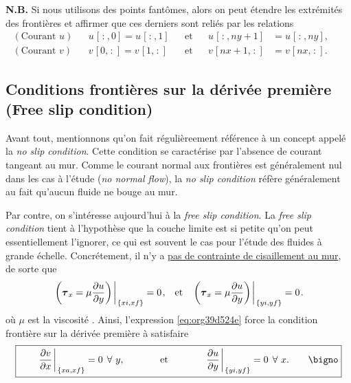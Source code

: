 \documentclass[10pt]{article}
\numberwithin{equation}{section}
\newcommand{\pt}{\hspace{1pt}} %
\begin{document}
\textbf{N.B.} Si nous utilisons des points fantômes, alors on peut étendre les extrémités des frontières et affirmer que ces derniers sont reliés par les relations
\begin{subequations}
\begin{align}
(\text{Courant }u) &&  u\pt[\pt:\pt,0] = u\pt[\pt:\pt,1] && \text{et} && u\pt[\pt:\pt,ny+1] &= u\pt[\pt:\pt,ny],&&\\
(\text{Courant }v) &&  v\pt[0,\pt:\pt] = v\pt[1,\pt:\pt] && \text{et} && v\pt[nx+1,\pt:\pt] &= v\pt[nx,\pt:\pt].&&
\end{align}
\end{subequations}

\subsection{Conditions frontières sur la dérivée première (Free slip condition)}
\label{sec:org9362732}
Avant tout, mentionnons qu'on fait régulièreement référence à un concept appelé la \emph{no slip condition}.
Cette condition se caractérise par l'absence de courant tangeant au mur.
Comme le courant normal aux frontières est généralement nul dans les cas à l'étude (\emph{no normal flow}), la \emph{no slip condition} réfère généralement au fait qu'aucun fluide ne bouge au mur.\bigskip

Par contre, on s'intéresse aujourd'hui à la \emph{free slip condition}.
La \emph{free slip condition} tient à l'hypothèse que la couche limite est si petite qu'on peut essentiellement l'ignorer, ce qui est souvent le cas pour l'étude des fluides à grande échelle.
Concrétement, il n'y a \href{https://physics.stackexchange.com/questions/383096/understanding-free-slip-boundary-condition\#:\~:text=On\%20the\%20other\%20hand\%2C\%20the,the\%20tangential\%20component\%20is\%20unrestricted.}{pas de contrainte de cisaillement au mur}, de sorte que
\begin{align}
\label{eq:org39d524e}
&&\eval{\qty(\boldsymbol{\tau}_x = \mu \pdv{u}{y})\pt }_{\pt\{xi,xf\}} = 0\pt, && \text{et} &&
  \eval{\qty(\boldsymbol{\tau}_x = \mu \pdv{u}{y})\pt }_{\pt\{yi,yf\}} = 0\pt. &&
\end{align}
où \(\mu\) est la viscosité \autocite{tan2018applying}.
Ainsi, l'expression \ref{eq:org39d524e} force la condition frontière sur la dérivée première à satisfaire 
\begin{equation}
\boxed{\hspace{0.7cm}\eval{\pdv{v}{x}\pt }_{\pt\{xa,xf\}} = 0\pt\ \forall\ y,\hspace{1.3cm} \text{et} \hspace{1.3cm} \eval{\pdv{u}{y}\pt }_{\pt \{yi,yf\}} = 0\pt\ \forall\ x.\hspace{0.7cm}\bigno}
\end{equation}
\end{document}

